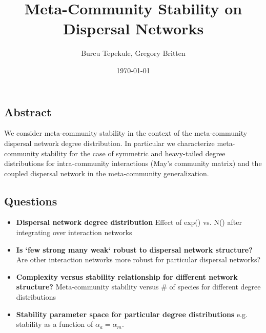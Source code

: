 \documentclass[12pt]{article}
\title{Meta-Community Stability on Dispersal Networks}
\author{\small{Burcu Tepekule, Gregory Britten}}
\date{\small{\printdayoff\today}}
\begin{document}
\maketitle 

\subsection*{Abstract}
We consider meta-community stability in the context of the meta-community dispersal network degree distribution. In particular we characterize meta-community stability for the case of symmetric and heavy-tailed degree distributions for intra-community interactions (May's community matrix) and the coupled dispersal network in the meta-community generalization. 

\subsection*{Questions}

\begin{itemize}

\item \textbf{Dispersal network degree distribution} Effect of exp() vs. N() after integrating over interaction networks
\item \textbf{Is `few strong many weak` robust to dispersal network structure?} Are other interaction networks more robust for particular dispersal networks? 
\item \textbf{Complexity versus stability relationship for different network structure?} Meta-community stability versus \# of species for different degree distributions
\item \textbf{Stability parameter space for particular degree distributions} e.g. stability  as a function of $\alpha_a = \alpha_m$.
\end{itemize}
\end{document}
